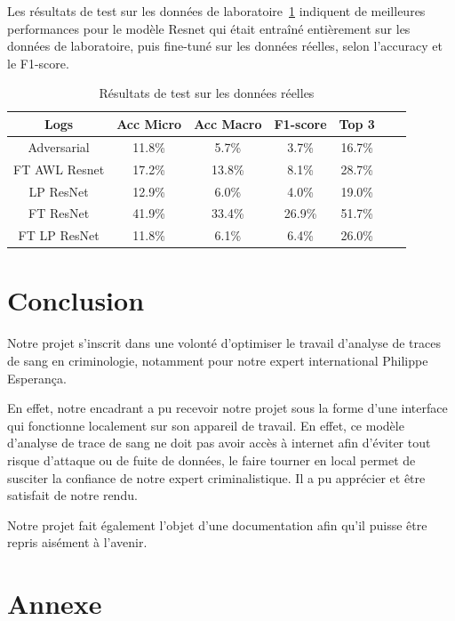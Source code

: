\documentclass[a4paper]{article}
\begin{document}
Les résultats de test sur les données de laboratoire~\ref{tab:results_real} indiquent de meilleures performances pour le modèle Resnet qui était entraîné entièrement sur les données de laboratoire, puis fine-tuné sur les données réelles, selon l'accuracy et le F1-score. 

\begin{table}[ht]
  \centering
  \caption{Résultats de test sur les données réelles}
    \begin{tabular}{|c|c|c|c|c|c|c|}
    \toprule
    Logs & Acc Micro & Acc Macro & F1-score & Top 3 \\
    \midrule
    Adversarial & 11.8\% & 5.7\% & 3.7\% & 16.7\% \\
    FT AWL Resnet & 17.2\% & 13.8\% & 8.1\% & 28.7\% \\
    LP ResNet & 12.9\% & 6.0\% & 4.0\% & 19.0\% \\
    FT ResNet & 41.9\% & 33.4\% & 26.9\% & 51.7\% \\
    FT LP ResNet & 11.8\% & 6.1\% & 6.4\% & 26.0\% \\
    \bottomrule
    \end{tabular}
  \label{tab:results_real}
\end{table}

\section{Conclusion}

Notre projet s'inscrit dans une volonté d'optimiser le travail d'analyse de traces de sang en criminologie, notamment pour notre expert international Philippe Esperança. 

En effet, notre encadrant a pu recevoir notre projet sous la forme d'une interface qui fonctionne localement sur son appareil de travail. En effet, ce modèle d'analyse de trace de sang ne doit pas avoir accès à internet afin d'éviter tout risque d'attaque ou de fuite de données, le faire tourner en local permet de susciter la confiance de notre expert criminalistique. Il a pu apprécier et être satisfait de notre rendu.

Notre projet fait également l'objet d'une documentation afin qu'il puisse être repris aisément à l'avenir. 

\printbibliography

\section{Annexe}
\end{document}

